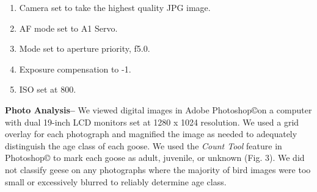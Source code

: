\documentclass[]{article}
\begin{document}
\begin{enumerate}
\setlength{\parskip}{1ex}
   \item Camera set to take the highest quality JPG image.
   \item AF mode set to A1 Servo.
   \item Mode set to aperture priority, f5.0.
   \item Exposure compensation to -1.
   \item ISO set at 800.
\end{enumerate}

\textbf{Photo Analysis--} We viewed digital images in Adobe
Photoshop\copyright\hspace{1ex}on a computer with dual 19-inch LCD
monitors set at 1280 x 1024 resolution. We used a grid overlay for each
photograph and magnified the image as needed to adequately distinguish
the age class of each goose. We used the \textit{Count Tool} feature in
Photoshop\copyright\hspace{1ex} to mark each goose as adult, juvenile,
or unknown (Fig. 3). We did not classify geese on any photographs where
the majority of bird images were too small or excessively blurred to
reliably determine age class.
\end{document}
